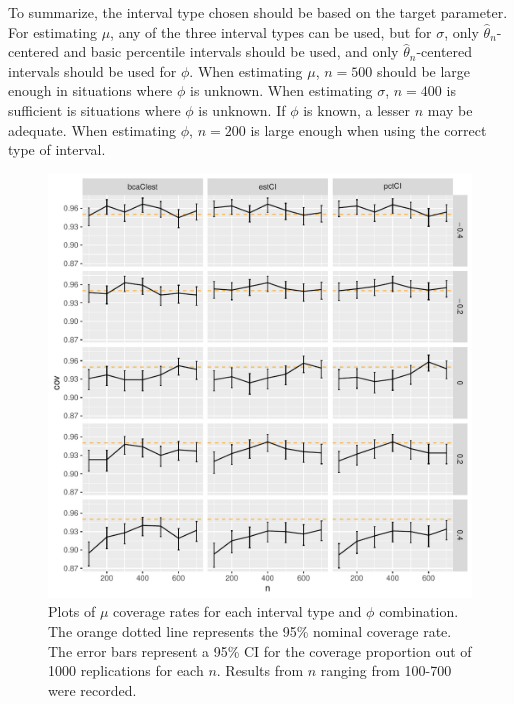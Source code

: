 \documentclass[12pt, letterpaper, titlepage]{article}
\begin{document}
To summarize, the interval type chosen should be based on the target parameter.
For estimating $\mu$, any of the three interval types can be used, but for
$\sigma$, only $\hat{\theta}_{n}$-centered and basic percentile intervals
should be used, and only $\hat{\theta}_{n}$-centered intervals should be used
for $\phi$. When estimating
$\mu$, $n = 500$ should be large enough in situations where $\phi$ is unknown.
When estimating $\sigma$, $n = 400$ is sufficient is situations where $\phi$ is
unknown. If $\phi$ is known, a lesser $n$ may be adequate. When estimating
$\phi$, $n = 200$ is large enough when using the correct type of interval.

\begin{figure}[tbp]
  \centering
  \includegraphics[width=\textwidth]{figures/plot_mu}
  \caption{Plots of $\mu$ coverage rates for each interval type and $\phi$
    combination. The orange dotted line represents the 95\% nominal coverage
    rate. The error bars represent a 95\% CI for the coverage
    proportion out of 1000 replications for each $n$. Results from $n$
    ranging from 100-700 were recorded.}
  \label{fig:mu}
\end{figure}
\end{document}
